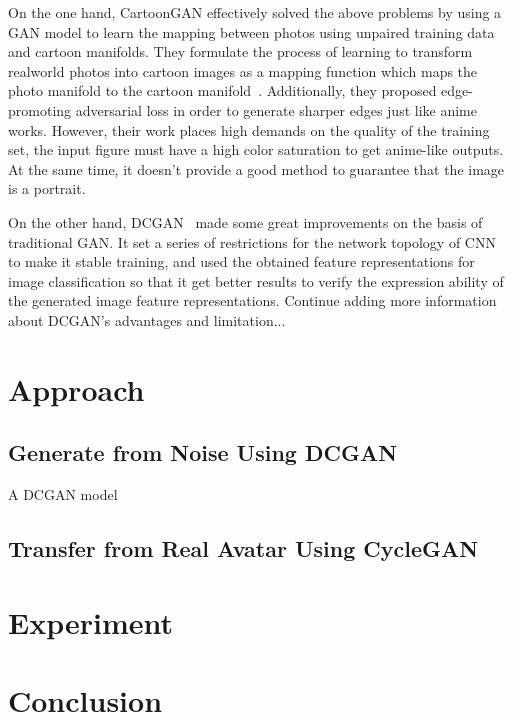 \documentclass[10pt,twocolumn,letterpaper]{article}
\begin{document}
On the one hand, CartoonGAN effectively solved the above problems by using a GAN model
to learn the mapping between photos using unpaired training data and
cartoon manifolds. They formulate the process of learning to transform realworld
photos into cartoon images as a mapping function which maps the photo
manifold to the cartoon manifold~\cite{CartoonGAN}. Additionally, they proposed
edge-promoting adversarial loss in order to generate sharper edges just like anime works.
However, their work places high demands on the quality of the training set, the input
figure must have a high color saturation to get anime-like outputs. At the same time,
it doesn't provide a good method to guarantee that the image is a portrait.

On the other hand, DCGAN~\cite{DCGAN} made some great improvements on the basis of traditional GAN.
It set a series of restrictions for the network topology of CNN to make it stable training, and
used the obtained feature representations for image classification so that it get better results
to verify the expression ability of the generated image feature representations.
{\color{red}Continue adding more information about DCGAN's advantages and limitation...}


\section{Approach}
\subsection{Generate from Noise Using DCGAN}
A DCGAN model


\subsection{Transfer from Real Avatar Using CycleGAN}

\section{Experiment}

\section{Conclusion}

{\small


}
\end{document}
